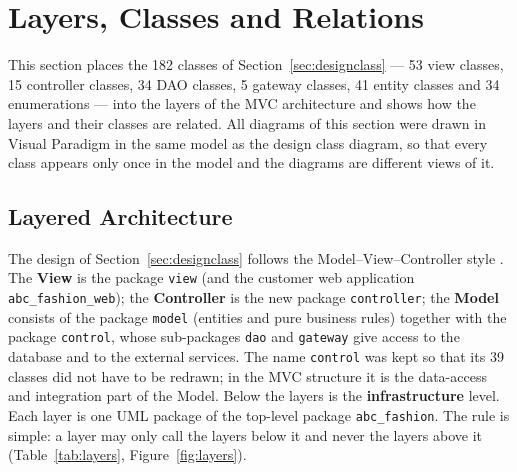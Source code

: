 \section{Layers, Classes and Relations}
\label{sec:layers}

This section places the 182 classes of Section~\ref{sec:designclass} --- 53 view classes, 15 controller classes, 34 DAO classes, 5 gateway classes, 41 entity classes and 34 enumerations --- into the layers of the MVC architecture and shows how the layers and their classes are related. All diagrams of this section were drawn in Visual Paradigm in the same model as the design class diagram, so that every class appears only once in the model and the diagrams are different views of it.

\subsection{Layered Architecture}
\label{subsec:architecture}
The design of Section~\ref{sec:designclass} follows the Model--View--Controller style \cite{dennis2020}. The \textbf{View} is the package \texttt{view} (and the customer web application \texttt{abc\_fashion\_web}); the \textbf{Controller} is the new package \texttt{controller}; the \textbf{Model} consists of the package \texttt{model} (entities and pure business rules) together with the package \texttt{control}, whose sub-packages \texttt{dao} and \texttt{gateway} give access to the database and to the external services. The name \texttt{control} was kept so that its 39 classes did not have to be redrawn; in the MVC structure it is the data-access and integration part of the Model. Below the layers is the \textbf{infrastructure} level. Each layer is one UML package of the top-level package \texttt{abc\_fashion}. The rule is simple: a layer may only call the layers below it and never the layers above it (Table~\ref{tab:layers}, Figure~\ref{fig:layers}).

